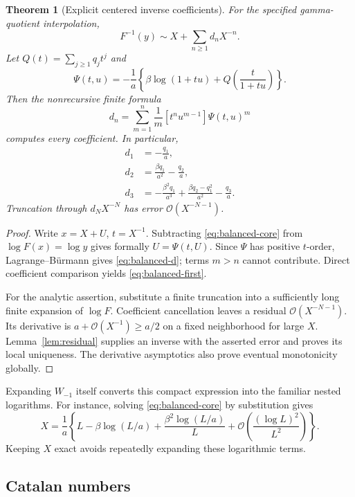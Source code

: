 \documentclass[11pt,a4paper]{article}
\numberwithin{equation}{section}
\newtheorem{theorem}{Theorem}[section]
\theoremstyle{definition}
\theoremstyle{remark}
\newcommand{\bigO}{\mathcal O}
\begin{document}
\begin{theorem}[Explicit centered inverse coefficients]
\label{thm:balanced-inverse}
For the specified gamma-quotient interpolation,
\begin{equation}
 F^{-1}(y)\sim X+\sum_{n\ge1}d_nX^{-n}.
 \label{eq:balanced-inverse}
\end{equation}
Let $Q(t)=\sum_{j\ge1}q_jt^j$ and
\[
 \Psi(t,u)=-\frac1a\left\{\beta\log(1+tu)
                     +Q\!\left(\frac{t}{1+tu}\right)\right\}.
\]
Then the nonrecursive finite formula
\begin{equation}
 d_n=\sum_{m=1}^n\frac1m[t^nu^{m-1}]\Psi(t,u)^m
 \label{eq:balanced-d}
\end{equation}
computes every coefficient. In particular,
\begin{align}
 d_1&=-\frac{q_1}{a},\nonumber\\
 d_2&=\frac{\beta q_1}{a^2}-\frac{q_2}{a},\nonumber\\
 d_3&=-\frac{\beta^2q_1}{a^3}
       +\frac{\beta q_2-q_1^2}{a^2}-\frac{q_3}{a}.
 \label{eq:balanced-first}
\end{align}
Truncation through $d_NX^{-N}$ has error $\bigO(X^{-N-1})$.
\end{theorem}
\begin{proof}
Write $x=X+U$, $t=X^{-1}$. Subtracting \eqref{eq:balanced-core} from $\log F(x)=\log y$ gives formally $U=\Psi(t,U)$. Since $\Psi$ has positive $t$-order, Lagrange--B\"urmann gives \eqref{eq:balanced-d}; terms $m>n$ cannot contribute. Direct coefficient comparison yields \eqref{eq:balanced-first}.

For the analytic assertion, substitute a finite truncation into a sufficiently long finite expansion of $\log F$. Coefficient cancellation leaves a residual $\bigO(X^{-N-1})$. Its derivative is $a+\bigO(X^{-1})\ge a/2$ on a fixed neighborhood for large $X$. Lemma~\ref{lem:residual} supplies an inverse with the asserted error and proves its local uniqueness. The derivative asymptotics also prove eventual monotonicity globally.
\end{proof}

Expanding $W_{-1}$ itself converts this compact expression into the familiar nested logarithms. For instance, solving \eqref{eq:balanced-core} by substitution gives
\[
 X=\frac1a\left\{L-\beta\log(L/a)
          +\frac{\beta^2\log(L/a)}{L}
          +\bigO\!\left(\frac{(\log L)^2}{L^2}\right)\right\}.
\]
Keeping $X$ exact avoids repeatedly expanding these logarithmic terms.

\subsection{Catalan numbers}
\label{subsec:catalan}
\end{document}
